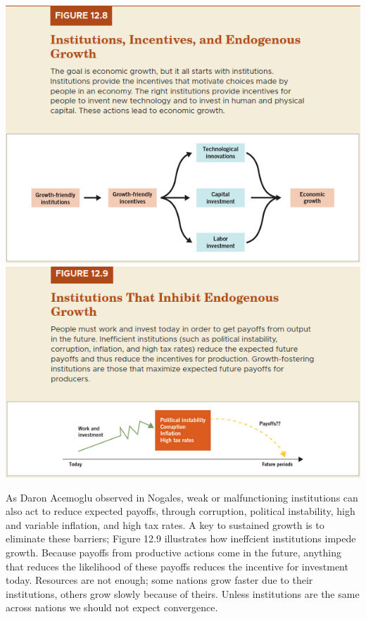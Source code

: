 \documentclass[11pt]{article} %
\begin{document}
\begin{center}
\includegraphics[scale=0.5]{Images/Figure 12.8.png}\\
\includegraphics[scale=0.5]{Images/Figure 12.9.png}
\end{center}
As Daron Acemoglu observed in Nogales, weak or malfunctioning institutions can also act to reduce expected payoffs, through corruption, political instability, high and variable inflation, and high tax rates. A key to sustained growth is to eliminate these barriers; Figure 12.9 illustrates how ineffcient institutions impede growth. Because payoffs from productive actions come in the future, anything that reduces the likelihood of these payoffs reduces the incentive for investment today. Resources are not enough; some nations grow faster due to their institutions, others grow slowly because of theirs. Unless institutions are the same across nations we should not expect convergence.
\end{document}
